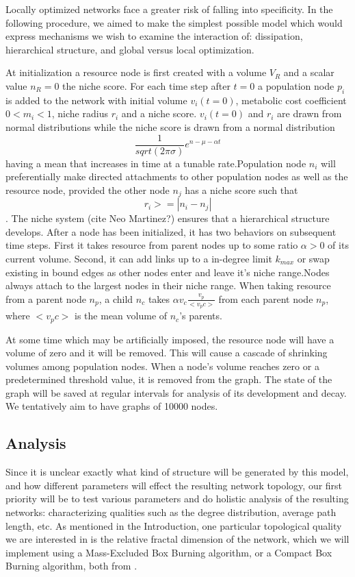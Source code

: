 \documentclass{paper}
\begin{document}
	Locally optimized networks face a greater risk of falling into specificity. In the following procedure, we aimed to make the simplest possible model which would express mechanisms we wish to examine the interaction of: dissipation, hierarchical structure, and global versus local optimization. 
	
	At initialization a resource node is first created with a volume $V_R$ and a scalar value $n_R=0$ the niche score. For each time step after $t=0$ a population node $p_i$ is added to the network with initial volume $v_i(t=0)$, metabolic cost coefficient $0<m_i<1$, niche radius $r_i$ and a niche score. $v_i(t=0)$ and $r_i$ are drawn from normal distributions while the niche score is drawn from a normal distribution $$\frac{1}{sqrt(2\pi \sigma)}e^{n-\mu-\alpha t}$$ having a mean that increases in time at a tunable rate.Population node $n_i$ will preferentially make directed attachments to other population nodes as well as the resource node, provided the other node $n_j$ has a niche score such that $$r_i >= |n_i-n_j|$$. The niche system (cite Neo Martinez?) ensures that a hierarchical structure develops. After a node has been initialized, it has two behaviors on subsequent time steps. First it takes resource from parent nodes up to some ratio $\alpha >0$ of its current volume. Second, it can add links up to a  in-degree limit $k_{max}$ or swap existing in bound edges as other nodes enter and leave it's niche range.Nodes always attach to the largest nodes in their niche range. When taking resource from a parent node $n_p$, a child $n_c$ takes $\alpha v_c \frac{v_p}{<v_pc>}$
	from each parent node $n_p$, where $<v_pc>$ is the mean volume of $n_c$'s parents. 
	
	At some time which may be artificially imposed, the resource node will have a volume of zero and it will be removed. This will cause a cascade of shrinking volumes among population nodes. When a node's volume reaches zero or a predetermined threshold value, it is removed from the graph. The state of the graph will be saved at regular intervals for analysis of its development and decay.  We tentatively aim to have graphs of 10000 nodes.
	
	
	\subsection{Analysis}
	Since it is unclear exactly what kind of structure will be generated by this model, and how different parameters will effect the resulting network topology, our first priority will be to test various parameters and do holistic analysis of the resulting networks: characterizing qualities such as the degree distribution, average path length, etc. As mentioned in the Introduction, one particular topological quality we are interested in is the relative fractal dimension of the network, which we will implement using a Mass-Excluded Box Burning algorithm, or a Compact Box Burning algorithm, both from \cite{song_how_2007}. 
	
\end{document}
